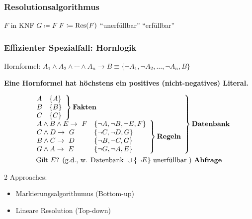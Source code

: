 \subsubsection{Resolutionsalgorithmus}
\begin{algorithmic}
\REQUIRE $F$ in KNF
\REPEAT
	\STATE $G \coloneqq F$
	\STATE $F \coloneqq \Res( F )$
	\PRINT \enquote{unerfüllbar}
\ELSE
	\PRINT \enquote{erfüllbar}
\ENDIF
\end{algorithmic}

\subsubsection{Effizienter Spezialfall: Hornlogik}
Hornformel: $A_1 \wedge A_2 \wedge \dotsb \wedge A_n \rightarrow B \equiv \{ \neg A_1 , \neg A_2 , \dotsc , \neg A_n , B \}$ \\
\begin{def*}[note = Hornformel , index = Hornformel]
	\textbf{Eine Hornformel hat höchstens ein positives (nicht-negatives) Literal.}
\end{def*}
\begin{bsp*}
	\begin{gather*}
		\left.\begin{array}{ l }
			\left.\begin{array}{ l l }
				A							& \{ A \}					\\
				B							& \{ B \}					\\
				C							& \{ C \}					
			\end{array} \right\} \textbf{Fakten}	\\
			\left.\begin{array}{ l l }
				A \wedge B \wedge E \rightarrow F	& \{ \neg A , \neg B , \neg E , F \}	\\
				C \wedge D  \rightarrow G			& \{ \neg C , \neg D , G \}		\\
				B \wedge C  \rightarrow D			& \{ \neg B , \neg C , G \}		\\
				G \wedge A  \rightarrow E			& \{ \neg G , \neg A , E \}		
			\end{array} \right\} \textbf{Regeln}
		\end{array} \right\} \textbf{Datenbank}	\\
		\text{Gilt } E \text{? (\gdw Datenbank } \cup \{ \neg E \} \text{ unerfüllbar ) } \textbf{Abfrage}
	\end{gather*}
\end{bsp*}
2 Approaches:
\begin{itemize}
	\item Markierungsalgorithumus (Bottom-up)
	\item Lineare Resolution (Top-down)
\end{itemize}
